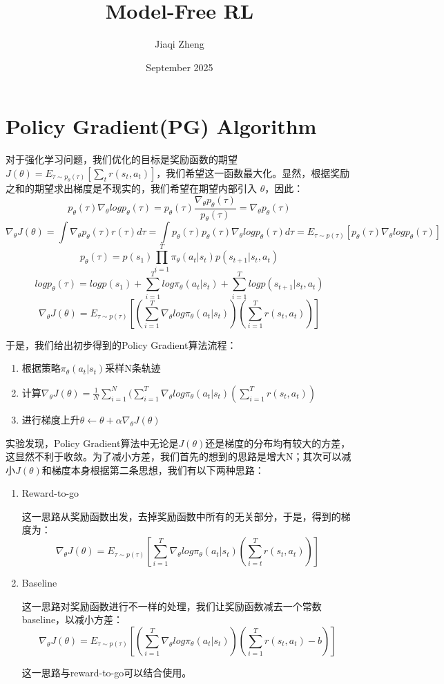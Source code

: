 \documentclass{article}
\title{Model-Free RL}
\author{Jiaqi Zheng}
\date{September 2025}
\theoremstyle{definition}
\begin{document}
\maketitle
\section{Policy Gradient(PG) Algorithm}
\par 对于强化学习问题，我们优化的目标是奖励函数的期望 $ J(\theta)=E_{\tau \sim p_{\theta}(\tau)}[\sum_t r(s_t,a_t)] $，我们希望这一函数最大化。显然，根据奖励之和的期望求出梯度是不现实的，我们希望在期望内部引入 $ \theta $，因此：
\[
 p_{\theta}(\tau)\nabla_{\theta}logp_{\theta}(\tau)=p_{\theta}(\tau)\frac{\nabla_{\theta}p_{\theta}(\tau)}{p_{\theta}(\tau)}=\nabla_{\theta}p_{\theta}(\tau)
\]
\[
 \nabla_{\theta}J(\theta)=\int \nabla_{\theta}p_{\theta}(\tau)r(\tau)d\tau=\int p_{\theta}(\tau)p_{\theta}(\tau)\nabla_{\theta}logp_{\theta}(\tau)d\tau=E_{\tau\sim p(\tau)}[p_{\theta}(\tau)\nabla_{\theta}logp_{\theta}(\tau)]
\]
\[
p_{\theta}(\tau)=p(s_1)\prod_{i=1}^T \pi_{\theta}(a_t|s_t)p(s_{t+1}|s_t,a_t)
\]
\[
logp_{\theta}(\tau)=logp(s_1)+\sum_{i=1}^Tlog\pi_{\theta}(a_t|s_t)+\sum_{i=1}^Tlogp(s_{t+1}|s_t,a_t)
\]
\[
\nabla_{\theta}J(\theta)=E_{\tau\sim p(\tau)}[(\sum_{i=1}^T\nabla_{\theta}log\pi_{\theta}(a_t|s_t))(\sum_{i=1}^Tr(s_t,a_t))]
\]
\par 于是，我们给出初步得到的Policy Gradient算法流程：
\begin{enumerate}
    \item 根据策略$ \pi_{\theta}(a_t|s_t) $采样N条轨迹
    \item 计算$ \nabla_{\theta}J(\theta)=\frac{1}{N}\sum_{i=1}^N(\sum_{i=1}^T\nabla_{\theta}log\pi_{\theta}(a_t|s_t)(\sum_{i=1}^Tr(s_t,a_t)) $
    \item 进行梯度上升$ \theta\leftarrow\theta+\alpha\nabla_{\theta}J(\theta) $
\end{enumerate}
\par 实验发现，Policy Gradient算法中无论是$ J(\theta) $还是梯度的分布均有较大的方差，这显然不利于收敛。为了减小方差，我们首先的想到的思路是增大N；其次可以减小$ J(\theta) $和梯度本身根据第二条思想，我们有以下两种思路：
\begin{enumerate}
    \item Reward-to-go
    \par 这一思路从奖励函数出发，去掉奖励函数中所有的无关部分，于是，得到的梯度为：
    \[
\nabla_{\theta}J(\theta)=E_{\tau\sim p(\tau)}[\sum_{i=1}^T\nabla_{\theta}log\pi_{\theta}(a_t|s_t)(\sum_{i=t}^Tr(s_t,a_t))]
\]
    \item Baseline
    \par 这一思路对奖励函数进行不一样的处理，我们让奖励函数减去一个常数baseline，以减小方差：
\[\nabla_{\theta}J(\theta)=E_{\tau\sim p(\tau)}[(\sum_{i=1}^T\nabla_{\theta}log\pi_{\theta}(a_t|s_t))(\sum_{i=1}^Tr(s_t,a_t)-b)]
\]
    \par 这一思路与reward-to-go可以结合使用。
\end{enumerate}
\end{document}
